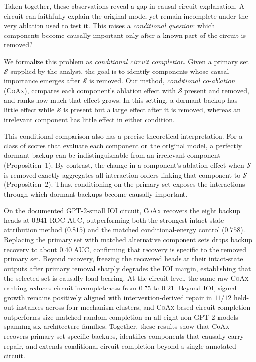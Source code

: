 \documentclass{article} %
\theoremstyle{plain}
\theoremstyle{definition}
\newcommand{\coax}{\textsc{CoAx}\xspace}
\newcommand{\Sset}{\mathcal{S}}
\newcommand{\primary}[1]{\textcolor{primarycolor}{#1}}
\newcommand{\backup}[1]{\textcolor{backupcolor}{#1}}
\newcommand{\irrelevant}[1]{\textcolor{irrelevantcolor}{#1}}
\begin{document}
Taken together, these observations reveal a gap in causal circuit explanation.
A circuit can faithfully explain the original model yet remain incomplete under the very ablation used to test it.
This raises a \emph{conditional question}: which components become causally important only after a known part of the circuit is removed?

We formalize this problem as \emph{conditional circuit completion}.
Given a \primary{primary} set $\Sset$ supplied by the analyst, the goal is to identify components whose causal importance emerges after $\Sset$ is removed.
Our method, \emph{conditional co-ablation} (\coax), compares each component's ablation effect with $\Sset$ present and removed, and ranks how much that effect grows.
In this setting, a dormant \backup{backup} has little effect while $\Sset$ is present but a large effect after it is removed, whereas an \irrelevant{irrelevant} component has little effect in either condition.

This conditional comparison also has a precise theoretical interpretation.
For a class of scores that evaluate each component on the original model, a perfectly dormant backup can be indistinguishable from an irrelevant component (Proposition~1).
By contrast, the change in a component's ablation effect when $\Sset$ is removed exactly aggregates all interaction orders linking that component to $\Sset$ (Proposition~2).
Thus, conditioning on the primary set exposes the interactions through which dormant backups become causally important.

On the documented GPT-2-small IOI circuit, \coax recovers the eight backup heads at $0.941$ ROC-AUC, outperforming both the strongest intact-state attribution method ($0.815$) and the matched conditional-energy control ($0.758$).
Replacing the primary set with matched alternative component sets drops backup recovery to about $0.40$ AUC, confirming that recovery is specific to the removed primary set.
Beyond recovery, freezing the recovered heads at their intact-state outputs after primary removal sharply degrades the IOI margin, establishing that the selected set is causally load-bearing.
At the circuit level, the same raw \coax ranking reduces circuit incompleteness from $0.75$ to $0.21$.
Beyond IOI, signed growth remains positively aligned with intervention-derived repair in $11/12$ held-out instances across four mechanism clusters, and \coax-based circuit completion outperforms size-matched random completion on all eight non-GPT-2 models spanning six architecture families.
Together, these results show that \coax recovers primary-set-specific backups, identifies components that causally carry repair, and extends conditional circuit completion beyond a single annotated circuit.
\end{document}
